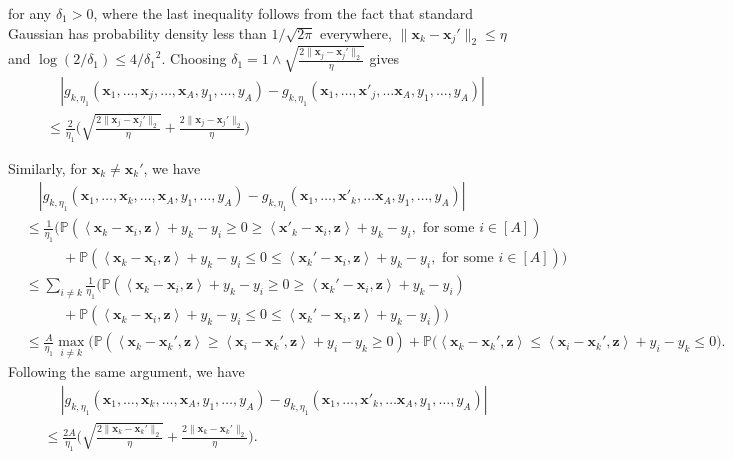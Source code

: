\documentclass[10pt]{article}
\newcommand{\<}{\left\langle}
\renewcommand{\>}{\right\rangle}
\renewcommand{\P}{\mathbb{P}}
\newcommand{\trunprob}{{\eta_1}}
\newcommand{\Trunregp}{{\eta}}
\def\bx{{\mathbf x}}
\def\bz{{\mathbf z}}
\begin{document}
for any ${\delta_1}>0$, 
where the last inequality follows from the fact that standard Gaussian has probability density less than $1/\sqrt{2\pi}$ everywhere,  $\|\bx_k-\bx_j'\|_2\leq \Trunregp$ and $\log(2/{\delta_1})\leq 4/{\delta_1}^2$. Choosing ${\delta_1}=1\wedge\sqrt{\frac{2\|\bx_j-\bx_j'\|_2}{\Trunregp}}$ gives 
\begin{align*}
 &\quad |g_{k,\trunprob}(\bx_1,\ldots,\bx_j,\ldots,\bx_A,y_1,\ldots,y_A)-g_{k,\trunprob}(\bx_1,\ldots,\bx'_j,\ldots\bx_A,y_1,\ldots,y_A)|\\
 &\leq  
  \frac{2}{\trunprob}\Big(\sqrt{\frac{2\|\bx_j-\bx_j'\|_2}{\Trunregp}}+\frac{2\|\bx_j-\bx_j'\|_2}{\Trunregp}\Big)
\end{align*}

Similarly, for $\bx_k\neq\bx_k'$, we have 
\begin{align*}
     &\quad|g_{k,\trunprob}(\bx_1,\ldots,\bx_k,\ldots,\bx_A,y_1,\ldots,y_A)-g_{k,\trunprob}(\bx_1,\ldots,\bx'_k,\ldots\bx_A,y_1,\ldots,y_A)|
        \\
     &\leq
     \frac{1}{\trunprob}\Big(\P(\<\bx_k-\bx_i,\bz\>+y_k-y_i\geq0\geq \<\bx'_k-\bx_i,\bz\>+y_k-y_i,\text{~for some~}i\in[A])\\&\qquad~~~+\P(\<\bx_k-\bx_i,\bz\>+y_k-y_i\leq0\leq \<\bx_k'-\bx_i,\bz\>+y_k-y_i,\text{~for some~}i\in[A])\Big)
     \\
       &\leq
    \sum_{i\neq k} \frac{1}{\trunprob}\Big(\P(\<\bx_k-\bx_i,\bz\>+y_k-y_i\geq0\geq \<\bx_k'-\bx_i,\bz\>+y_k-y_i)\\&\qquad~~~+\P(\<\bx_k-\bx_i,\bz\>+y_k-y_i\leq0\leq \<\bx_k'-\bx_i,\bz\>+y_k-y_i)\Big)\\
    &\leq \frac{A}{\trunprob}\max_{i
    \neq k}\Big(\P(\<\bx_k-\bx_k',\bz\>\geq\<\bx_i-\bx_k',\bz\>+y_i-y_k\geq0 )+\P(\<\bx_k-\bx_k',\bz\>\leq \<\bx_i-\bx_k',\bz\>+y_i-y_k\leq0\Big).
\end{align*}
Following the same argument, we have 
\begin{align*}
&\quad~|g_{k,\trunprob}(\bx_1,\ldots,\bx_k,\ldots,\bx_A,y_1,\ldots,y_A)-g_{k,\trunprob}(\bx_1,\ldots,\bx'_k,\ldots\bx_A,y_1,\ldots,y_A)|\\&\leq   \frac{2A}{\trunprob}\Big(\sqrt{\frac{2\|\bx_k-\bx_k'\|_2}{\Trunregp}}+\frac{2\|\bx_k-\bx_k'\|_2}{\Trunregp}\Big).
\end{align*}
\end{document}
